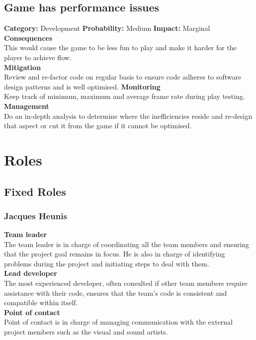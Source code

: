 \documentclass[a4paper,10pt]{article}
\begin{document}
\subsection{Game has performance issues}
\textbf{Category:} Development\newline
\textbf{Probability:} Medium\newline
\textbf{Impact:} Marginal
\\\textbf{Consequences}\\
This would cause the game to be less fun to play and make it harder for the player to achieve flow.
\smallskip\\\textbf{Mitigation}\\
Review and re-factor code on regular basis to ensure code adheres to software design patterns and is well optimised.
\smallskip\textbf{Monitoring}\\
Keep track of minimum, maximum and average frame rate during play testing.
\smallskip\\\textbf{Management}\\
Do an in-depth analysis to determine where the inefficiencies reside and re-design that aspect or cut it from the game if it cannot be optimised.

\section{Roles}
\subsection{Fixed Roles}
\subsubsection{Jacques Heunis}
\textbf{Team leader}\\
The team leader is in charge of coordinating all the team members and ensuring that the project goal remains in focus. He is also in charge of identifying problems during the project and initiating steps to deal with them.
\smallskip\\
\textbf{Lead developer}\\
The most experienced developer, often consulted if other team members require assistance with their code, ensures that the team's code is consistent and compatible within itself.
\smallskip\\
\textbf{Point of contact}\\
Point of contact is in charge of managing communication with the external project members such as the visual and sound artists.
\end{document}
